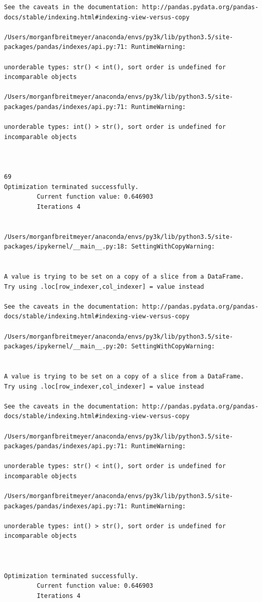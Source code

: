 \begin{lstlisting}
See the caveats in the documentation: http://pandas.pydata.org/pandas-docs/stable/indexing.html#indexing-view-versus-copy

/Users/morganfbreitmeyer/anaconda/envs/py3k/lib/python3.5/site-packages/pandas/indexes/api.py:71: RuntimeWarning:

unorderable types: str() < int(), sort order is undefined for incomparable objects

/Users/morganfbreitmeyer/anaconda/envs/py3k/lib/python3.5/site-packages/pandas/indexes/api.py:71: RuntimeWarning:

unorderable types: int() > str(), sort order is undefined for incomparable objects



69
Optimization terminated successfully.
         Current function value: 0.646903
         Iterations 4


/Users/morganfbreitmeyer/anaconda/envs/py3k/lib/python3.5/site-packages/ipykernel/__main__.py:18: SettingWithCopyWarning:


A value is trying to be set on a copy of a slice from a DataFrame.
Try using .loc[row_indexer,col_indexer] = value instead

See the caveats in the documentation: http://pandas.pydata.org/pandas-docs/stable/indexing.html#indexing-view-versus-copy

/Users/morganfbreitmeyer/anaconda/envs/py3k/lib/python3.5/site-packages/ipykernel/__main__.py:20: SettingWithCopyWarning:


A value is trying to be set on a copy of a slice from a DataFrame.
Try using .loc[row_indexer,col_indexer] = value instead

See the caveats in the documentation: http://pandas.pydata.org/pandas-docs/stable/indexing.html#indexing-view-versus-copy

/Users/morganfbreitmeyer/anaconda/envs/py3k/lib/python3.5/site-packages/pandas/indexes/api.py:71: RuntimeWarning:

unorderable types: str() < int(), sort order is undefined for incomparable objects

/Users/morganfbreitmeyer/anaconda/envs/py3k/lib/python3.5/site-packages/pandas/indexes/api.py:71: RuntimeWarning:

unorderable types: int() > str(), sort order is undefined for incomparable objects



Optimization terminated successfully.
         Current function value: 0.646903
         Iterations 4



\end{lstlisting}
